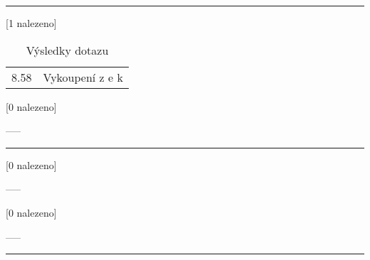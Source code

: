 \begin{table}[H]
\begin{tt}

\mbox{}\vspace{1em}
\hrule
\mbox{}

\noindent
\begin{minipage}[t]{.5\textwidth}\vspace{0pt}
 [1 nalezeno]\vspace{5pt}

\begin{tabulary}{1.1\textwidth}{LL}
8.58 & Vykoupení z e k \\
\end{tabulary}
\end{minipage}
\begin{minipage}[t]{.5\textwidth}\vspace{0pt}
 [0 nalezeno]\vspace{5pt}

-----
\end{minipage}

\mbox{}\vspace{5pt}
\hrule
\mbox{}

\noindent
\begin{minipage}[t]{.5\textwidth}\vspace{0pt}
 [0 nalezeno]\vspace{5pt}

-----
\end{minipage}
\begin{minipage}[t]{.5\textwidth}\vspace{0pt}
 [0 nalezeno]\vspace{5pt}

-----
\end{minipage}

\mbox{}\vspace{5pt}
\hrule
\mbox{}
\end{tt}

\caption{Výsledky dotazu }
\label{tab:result:vezeni_showsank}
\end{table}
